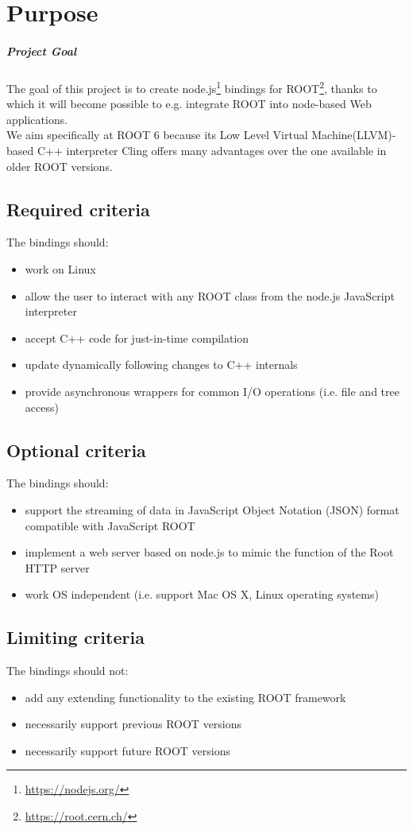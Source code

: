 \chapter{Purpose}
\paragraph{Project Goal}
The goal of this project is to create node.js\textsuperscript{\textregistered}\footnote{\url{https://nodejs.org/}} bindings for
ROOT\footnote{\url{https://root.cern.ch/}}, thanks to which it will become possible to e.g. integrate ROOT into node-based Web applications.\\
We aim specifically at ROOT 6 because its Low Level Virtual Machine(LLVM)-based C++ interpreter Cling offers many advantages over the one available in older ROOT versions.
\section{Required criteria}
The bindings should:
\begin{itemize}
	\item work on Linux
	\item allow the user to interact with any ROOT class from the node.js JavaScript interpreter
	\item accept C++ code for just-in-time compilation
	\item update dynamically following changes to C++ internals
	\item provide asynchronous wrappers for common I/O operations (i.e. file and tree access)
\end{itemize}
\pagebreak[3]

\section{Optional criteria}
The bindings should:
\begin{itemize}
	\item support the streaming of data in JavaScript Object Notation (JSON) format compatible with JavaScript ROOT
	\item implement a web server based on node.js to mimic the function of the Root HTTP server
	\item work OS independent (i.e. support Mac OS X, Linux operating systems)
\end{itemize}

\section{Limiting criteria}
The bindings should not:
\begin{itemize}
	\item add any extending functionality to the existing ROOT framework
	\item necessarily support previous ROOT versions
	\item necessarily support future ROOT versions
\end{itemize}
